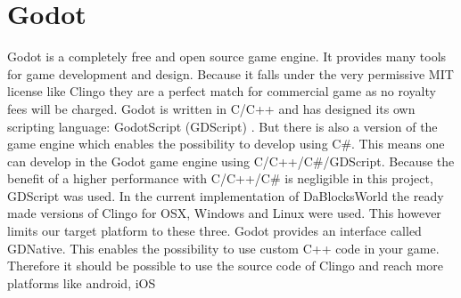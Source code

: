 \documentclass[runningheads]{llncs}
\begin{document}
    \section{Godot}
        Godot is a completely free and open source game engine.
        It provides many tools for game development and design.
        Because it falls under the very permissive MIT license like Clingo 
        they are a perfect match for commercial game as no royalty fees will be charged.
        Godot is written in C/C++ and has designed its own scripting language: GodotScript (GDScript) \cite{godotWebsite}.
        But there is also a version of the game engine which enables the possibility to develop using C\#.
        This means one can develop in the Godot game engine using C/C++/C\#/GDScript.
        Because the benefit of a higher performance with C/C++/C\# \cite{godotPerformanceComparison} is negligible in this project,
        GDScript was used.\newline
        In the current implementation of DaBlocksWorld the ready made versions of Clingo for OSX, Windows and Linux \cite{clingoGithub} were used.
        This however limits our target platform to these three.
        Godot provides an interface called GDNative.
        This enables the possibility to use custom C++ code in your game.
        Therefore it should be possible to use the source code of Clingo \cite{clingoGithub} and reach more platforms like android, iOS  
        
\end{document}
